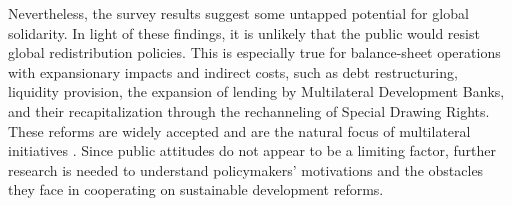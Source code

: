 \documentclass[12pt,english]{article}
\begin{document}
Nevertheless, the survey results %
suggest some untapped potential for global solidarity. In light of these findings, it is unlikely that the public would resist global redistribution policies. This is especially true for balance-sheet operations with expansionary impacts and indirect costs, such as debt restructuring, liquidity provision, %
the expansion of lending by Multilateral Development Banks, and their recapitalization through the rechanneling of Special Drawing Rights. These reforms are widely accepted and are the natural focus of multilateral initiatives \citep{bridgetown_initiative_bridgetown_2025,ffd4_outcome_2025}. %
Since public attitudes do not appear to be a limiting factor, further research is needed to understand policymakers' motivations and the obstacles they face in cooperating on sustainable development reforms. 


\end{document}
